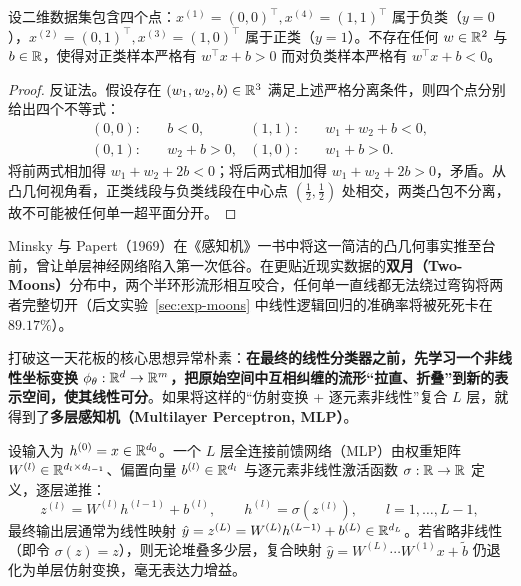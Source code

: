 \begin{thmBox}
\begin{proposition}
\label{prop:xor-inseparable}
设二维数据集包含四个点：$x^{(1)} = (0,0)^\top, x^{(4)} = (1,1)^\top$ 属于负类（$y=0$），$x^{(2)} = (0,1)^\top, x^{(3)} = (1,0)^\top$ 属于正类（$y=1$）。不存在任何 $w \in \mathbb{R}^2$ 与 $b \in \mathbb{R}$，使得对正类样本严格有 $w^\top x + b > 0$ 而对负类样本严格有 $w^\top x + b < 0$。
\end{proposition}
\begin{proof}
反证法。假设存在 $(w_1, w_2, b) \in \mathbb{R}^3$ 满足上述严格分离条件，则四个点分别给出四个不等式：
\begin{align*}
  (0,0):\quad & b < 0, & (1,1):\quad & w_1 + w_2 + b < 0, \\
  (0,1):\quad & w_2 + b > 0, & (1,0):\quad & w_1 + b > 0.
\end{align*}
将前两式相加得 $w_1 + w_2 + 2b < 0$；将后两式相加得 $w_1 + w_2 + 2b > 0$，矛盾。从凸几何视角看，正类线段与负类线段在中心点 $(\frac{1}{2}, \frac{1}{2})$ 处相交，两类凸包不分离，故不可能被任何单一超平面分开。
\end{proof}
\end{thmBox}

Minsky 与 Papert（1969）在《感知机》一书中将这一简洁的凸几何事实推至台前，曾让单层神经网络陷入第一次低谷。在更贴近现实数据的\textbf{双月（Two-Moons）}分布中，两个半环形流形相互咬合，任何单一直线都无法绕过弯钩将两者完整切开（后文实验~\ref{sec:exp-moons} 中线性逻辑回归的准确率将被死死卡在 $89.17\%$）。

打破这一天花板的核心思想异常朴素：\textbf{在最终的线性分类器之前，先学习一个非线性坐标变换 $\phi_\theta: \mathbb{R}^d \to \mathbb{R}^m$，把原始空间中互相纠缠的流形“拉直、折叠”到新的表示空间，使其线性可分}。如果将这样的“仿射变换 + 逐元素非线性”复合 $L$ 层，就得到了\textbf{多层感知机（Multilayer Perceptron, MLP）}。

\begin{defBox}
\begin{definition}[多层感知机与激活函数]
设输入为 $h^{(0)} = x \in \mathbb{R}^{d_0}$。一个 $L$ 层全连接前馈网络（MLP）由权重矩阵 $W^{(l)} \in \mathbb{R}^{d_l \times d_{l-1}}$、偏置向量 $b^{(l)} \in \mathbb{R}^{d_l}$ 与逐元素非线性激活函数 $\sigma: \mathbb{R} \to \mathbb{R}$ 定义，逐层递推：
\begin{equation}
  z^{(l)} = W^{(l)} h^{(l-1)} + b^{(l)}, \qquad h^{(l)} = \sigma\!\left(z^{(l)}\right), \qquad l = 1, \dots, L-1,
  \label{eq:mlp-def}
\end{equation}
最终输出层通常为线性映射 $\hat{y} = z^{(L)} = W^{(L)} h^{(L-1)} + b^{(L)} \in \mathbb{R}^{d_L}$。若省略非线性（即令 $\sigma(z)=z$），则无论堆叠多少层，复合映射 $\hat{y} = W^{(L)} \cdots W^{(1)} x + \tilde{b}$ 仍退化为单层仿射变换，毫无表达力增益。
\end{definition}
\end{defBox}

